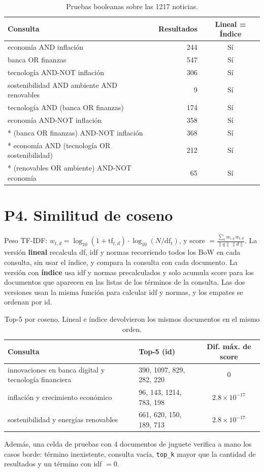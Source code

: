 \documentclass[11pt,a4paper]{article}
\newcommand{\code}[1]{\texttt{#1}}
\begin{document}
\begin{table}[H]\centering\small
\begin{tabular}{lrc}\toprule
Consulta & Resultados & Lineal = Índice\\\midrule
economía AND inflación & 244 & Sí\\
banca OR finanzas & 547 & Sí\\
tecnología AND-NOT inflación & 306 & Sí\\
sostenibilidad AND ambiente AND renovables & 9 & Sí\\
tecnología AND (banca OR finanzas) & 174 & Sí\\
economía AND-NOT inflación & 358 & Sí\\
* (banca OR finanzas) AND-NOT inflación & 368 & Sí\\
* economía AND (tecnología OR sostenibilidad) & 212 & Sí\\
* (renovables OR ambiente) AND-NOT economía & 65 & Sí\\
\bottomrule\end{tabular}
\caption{Pruebas booleanas sobre las 1217 noticias.}\label{tab:bool}
\end{table}

\section{P4. Similitud de coseno}
Peso TF-IDF: $w_{t,d} = \log_{10}(1+\mathrm{tf}_{t,d})\cdot\log_{10}(N/\mathrm{df}_t)$, y
score $=\frac{\sum_t w_{t,q}\,w_{t,d}}{\lVert q\rVert\,\lVert d\rVert}$.
La versión \textbf{lineal} recalcula df, idf y normas recorriendo todos los BoW en cada consulta,
sin usar el índice, y compara la consulta con cada documento. La versión con \textbf{índice} usa idf
y normas precalculados y solo acumula score para los documentos que aparecen en las listas de los
términos de la consulta. Las dos versiones usan la misma función para calcular idf y normas, y los
empates se ordenan por id.

\begin{table}[H]\centering\small
\begin{tabular}{p{5.6cm}p{4.4cm}c}\toprule
Consulta & Top-5 (id) & Dif. máx. de score\\\midrule
innovaciones en banca digital y tecnología financiera & 390, 1097, 829, 282, 220 & 0\\
inflación y crecimiento económico & 96, 143, 1214, 783, 198 & $2.8\times10^{-17}$\\
sostenibilidad y energías renovables & 661, 620, 150, 189, 713 & $2.8\times10^{-17}$\\
\bottomrule\end{tabular}
\caption{Top-5 por coseno. Lineal e índice devolvieron los mismos documentos en el mismo orden.}
\end{table}
Además, una celda de pruebas con 4 documentos de juguete verifica a mano los casos borde: término
inexistente, consulta vacía, \code{top\_k} mayor que la cantidad de resultados y un término con idf $=0$.
\end{document}
